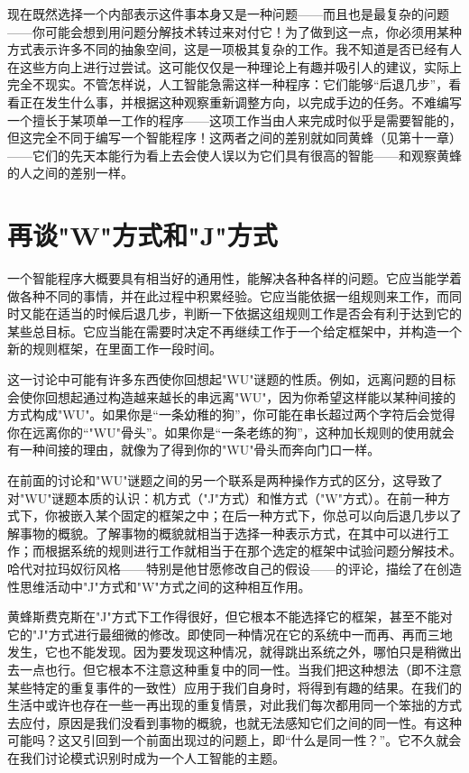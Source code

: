 现在既然选择一个内部表示这件事本身又是一种问题——而且也是最复杂的问题——你可能会想到用问题分解技术转过来对付它！为了做到这一点，你必须用某种方式表示许多不同的抽象空间，这是一项极其复杂的工作。我不知道是否已经有人在这些方向上进行过尝试。这可能仅仅是一种理论上有趣并吸引人的建议，实际上完全不现实。不管怎样说，人工智能急需这样一种程序：它们能够“后退几步”，看看正在发生什么事，并根据这种观察重新调整方向，以完成手边的任务。不难编写一个擅长于某项单一工作的程序——这项工作当由人来完成时似乎是需要智能的，但这完全不同于编写一个智能程序！这两者之间的差别就如同黄蜂（见第十一章）——它们的先天本能行为看上去会使人误以为它们具有很高的智能——和观察黄蜂的人之间的差别一样。

\section{再谈"W"方式和"J"方式}

一个智能程序大概要具有相当好的通用性，能解决各种各样的问题。它应当能学着做各种不同的事情，并在此过程中积累经验。它应当能依据一组规则来工作，而同时又能在适当的时候后退几步，判断一下依据这组规则工作是否会有利于达到它的某些总目标。它应当能在需要时决定不再继续工作于一个给定框架中，并构造一个新的规则框架，在里面工作一段时间。

这一讨论中可能有许多东西使你回想起"WU"谜题的性质。例如，远离问题的目标会使你回想起通过构造越来越长的串远离"WU"，因为你希望这样能以某种间接的方式构成"WU"。如果你是“一条幼稚的狗”，你可能在串长超过两个字符后会觉得你在远离你的“"WU"骨头”。如果你是“一条老练的狗”，这种加长规则的使用就会有一种间接的理由，就像为了得到你的"WU"骨头而奔向门口一样。

在前面的讨论和"WU"谜题之间的另一个联系是两种操作方式的区分，这导致了对"WU"谜题本质的认识：机方式（"J"方式）和惟方式（"W"方式）。在前一种方式下，你被嵌入某个固定的框架之中；在后一种方式下，你总可以向后退几步以了解事物的概貌。了解事物的概貌就相当于选择一种表示方式，在其中可以进行工作；而根据系统的规则进行工作就相当于在那个选定的框架中试验问题分解技术。哈代对拉玛奴衍风格——特别是他甘愿修改自己的假设——的评论，描绘了在创造性思维活动中"J"方式和"W"方式之间的这种相互作用。

黄蜂斯费克斯在"J"方式下工作得很好，但它根本不能选择它的框架，甚至不能对它的"J"方式进行最细微的修改。即使同一种情况在它的系统中一而再、再而三地发生，它也不能发现。因为要发现这种情况，就得跳出系统之外，哪怕只是稍微出去一点也行。但它根本不注意这种重复中的同一性。当我们把这种想法（即不注意某些特定的重复事件的一致性）应用于我们自身时，将得到有趣的结果。在我们的生活中或许也存在一些一再出现的重复情景，对此我们每次都用同一个笨拙的方式去应付，原因是我们没看到事物的概貌，也就无法感知它们之间的同一性。有这种可能吗？这又引回到一个前面出现过的问题上，即“什么是同一性？”。它不久就会在我们讨论模式识别时成为一个人工智能的主题。

